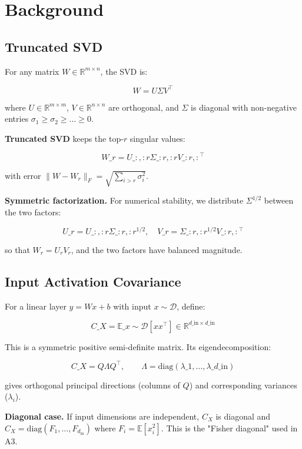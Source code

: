
\section{Background}

\subsection{Truncated SVD}

For any matrix $W \in \mathbb{R}^{m \times n}$, the SVD is:

\[
W = U \Sigma V^\top
\tag{3.1}
\]

where $U \in \mathbb{R}^{m \times m}$, $V \in \mathbb{R}^{n \times n}$ are 
orthogonal, and $\Sigma$ is diagonal with non-negative entries 
$\sigma_1 \geq \sigma_2 \geq \dots \geq 0$.

\textbf{Truncated SVD} keeps the top-$r$ singular values:

\[
W\_r = U\_{:, :r} \Sigma\_{:r, :r} V\_{:r, :}^\top
\tag{3.2}
\]

with error $\|W - W_r\|_F = \sqrt{\sum_{i > r} \sigma_i^2}$.

\textbf{Symmetric factorization.} For numerical stability, we distribute 
$\Sigma^{1/2}$ between the two factors:

\[
U\_r = U\_{:, :r} \Sigma\_{:r, :r}^{1/2}, \quad
V\_r = \Sigma\_{:r, :r}^{1/2} V\_{:r, :}^\top
\tag{3.3}
\]

so that $W_r = U_r V_r$, and the two factors have balanced magnitude.

\subsection{Input Activation Covariance}

For a linear layer $y = Wx + b$ with input $x \sim \mathcal{D}$, define:

\[
C\_X = \mathbb{E}\_{x \sim \mathcal{D}}\!\left[x x^\top\right] \in \mathbb{R}^{d\_\text{in} \times d\_\text{in}}
\tag{3.4}
\]

This is a symmetric positive semi-definite matrix. Its eigendecomposition:

\[
C\_X = Q \Lambda Q^\top, \qquad
\Lambda = \mathrm{diag}(\lambda\_1, \dots, \lambda\_{d\_\text{in}})
\tag{3.5}
\]

gives orthogonal principal directions (columns of $Q$) and corresponding 
variances ($\lambda_i$).

\textbf{Diagonal case.} If input dimensions are independent, $C_X$ is diagonal and 
$C_X = \mathrm{diag}(F_1, \dots, F_{d_\text{in}})$ where $F_i = \mathbb{E}[x_i^2]$. 
This is the "Fisher diagonal" used in A3.

